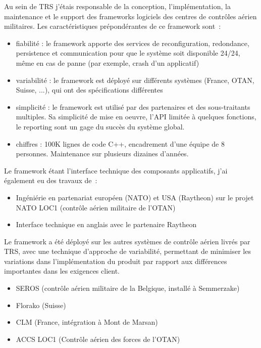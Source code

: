 {{{Au sein de TRS j'étais responsable de la conception, l'implémentation, la maintenance et le support des frameworks logiciels des centres de contrôles aérien militaires. Les caractéristiques prépondérantes de ce framework sont~:
\begin{itemize}
\item{fiabilité : le framework apporte des services de reconfiguration, redondance, persistence et communication pour que le système soit disponible 24/24, même en cas de panne (par exemple, crash d'un applicatif) }
\item{variabilité : le framework est déployé sur différents systèmes (France, OTAN, Suisse, ...), qui ont des spécifications différentes}
\item{simplicité : le framework est utilisé par des partenaires et des sous-traitants multiples. Sa simplicité de mise en oeuvre, l'API limitée à quelques fonctions, le reporting sont un gage du succès du système global.}
\item{chiffres : 100K lignes de code C++, encadrement d'une équipe de 8 personnes. Maintenance sur plusieurs dizaines d'années.}
\end{itemize}
Le framework étant l'interface technique des composants applicatifs, j'ai également eu des travaux de~:
\begin{itemize}
\item {Ingéniérie en partenariat européen (NATO) et USA (Raytheon) sur le projet NATO LOC1 (contrôle aérien militaire de l'OTAN)}
\item {Interface technique en anglais avec le partenaire Raytheon}
\end{itemize}
Le framework a été déployé sur les autres systèmes de contrôle aérien livrés par TRS, avec une technique d'approche de variabilité, permettant de minimiser les variations dans l'implémentation du produit par rapport aux différences importantes dans les exigences client.
 \begin{itemize}
 \item SEROS (contrôle aérien militaire de la Belgique, installé à Semmerzake)
 \item Florako (Suisse)
 \item CLM (France, intégration à Mont de Marsan)
\item ACCS LOC1 (Contrôle aérien des forces de l'OTAN)
\end{itemize}
}
}
}

